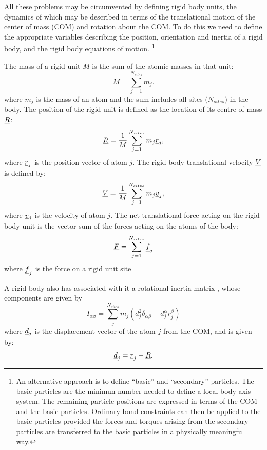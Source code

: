 All these problems may be circumvented by defining rigid body units,
the dynamics of which may be described in terms of the translational
motion of the center of mass (COM) and rotation about the COM. To do
this we need to define the appropriate variables describing the
position, orientation and inertia of a rigid body, and the rigid
body equations of motion. \footnote{An alternative
approach is to define ``basic'' and ``secondary'' particles. The basic
particles are the minimun number needed to define a local body axis
system. The remaining particle positions are expressed in terms of the
COM and the basic particles. Ordinary bond
constraints can then be applied to the basic
particles provided the forces and torques arising from the secondary
particles are transferred to the basic particles in a physically
meaningful way.}

The mass of a rigid unit $M$ is the sum of the atomic masses in that unit:
\begin{equation}
M = \sum_{j=1}^{N_{sites}} m_j. \label{netmass}
\end{equation}
where $m_j$ is the mass of an atom and the sum includes all sites
($N_{sites}$) in the body.  The position of the rigid unit is defined
as the location of its centre of mass $\mbox{$\underline{R}$}$:
\begin{equation}
\mbox{$\underline{R}$} = {1 \over M}\sum_{j=1}^{N_{sites}} m_j \mbox{$\underline{r}$}_j,
\end{equation}
where $\mbox{$\underline{r}$}_j$ is the position vector of atom $j$. The rigid body
translational velocity $\mbox{$\underline{V}$}$ is defined by:
\begin{equation}
\mbox{$\underline{V}$} = {1 \over M}\sum_{j=1}^{N_{sites}} m_j \mbox{$\underline{v}$}_j,
\end{equation}
where $\mbox{$\underline{v}$}_j$ is the velocity of atom $j$.
The net translational force acting on the rigid body unit is the vector sum
of the forces acting on the atoms of the body:
\begin{equation}
\mbox{$\underline{F}$} = \sum_{j=1}^{N_{sites}} \mbox{$\underline{f}$}_{j} \label{netforce}
\end{equation}
where $\mbox{$\underline{f}$}_{j}$ is the force on a rigid unit site

A rigid body also has associated with it a
rotational inertia matrix , whose components are given by 
\begin{equation}
I_{\alpha\beta} = 
\sum_{j}^{N_{sites}} m_j (d_j^2 \delta_{\alpha \beta}-d_j^{\alpha}
r_j^{\beta})
\end{equation}
where $\mbox{$\underline{d}$}_j$ is the displacement vector of the atom $j$ from the
COM, and is given by:
\begin{equation}
\mbox{$\underline{d}$}_{j}=\mbox{$\underline{r}$}_{j}-\mbox{$\underline{R}$}.
\end{equation}

